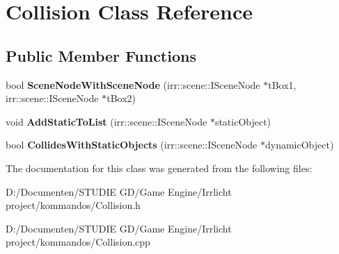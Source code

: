 \hypertarget{class_collision}{}\section{Collision Class Reference}
\label{class_collision}
\subsection*{Public Member Functions}
\begin{DoxyCompactItemize}
\item 
\mbox{\label{class_collision_aa2fa3418899ac7948b31eb909dea6f04}} 
bool {\bfseries Scene\+Node\+With\+Scene\+Node} (irr\+::scene\+::\+I\+Scene\+Node $\ast$t\+Box1, irr\+::scene\+::\+I\+Scene\+Node $\ast$t\+Box2)
\item 
\mbox{\label{class_collision_a673528880f1ad75dab13a2107a3d2b7c}} 
void {\bfseries Add\+Static\+To\+List} (irr\+::scene\+::\+I\+Scene\+Node $\ast$static\+Object)
\item 
\mbox{\label{class_collision_a334467ec1c8b7889aa46016fcedb13f9}} 
bool {\bfseries Collides\+With\+Static\+Objects} (irr\+::scene\+::\+I\+Scene\+Node $\ast$dynamic\+Object)
\end{DoxyCompactItemize}


The documentation for this class was generated from the following files\+:\begin{DoxyCompactItemize}
\item 
D\+:/\+Documenten/\+S\+T\+U\+D\+I\+E G\+D/\+Game Engine/\+Irrlicht project/kommandos/Collision.\+h\item 
D\+:/\+Documenten/\+S\+T\+U\+D\+I\+E G\+D/\+Game Engine/\+Irrlicht project/kommandos/Collision.\+cpp\end{DoxyCompactItemize}
